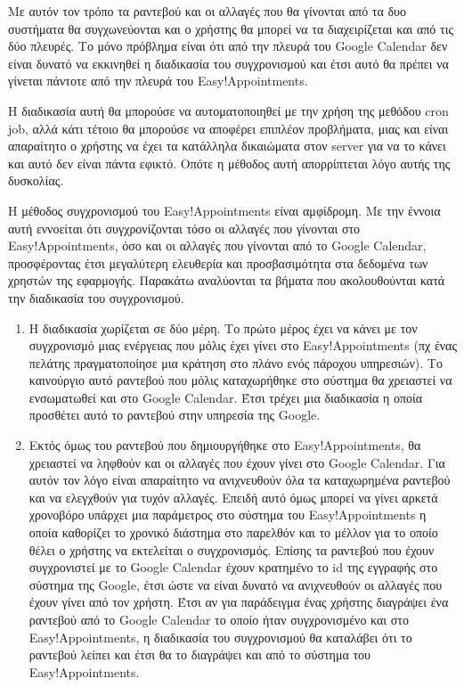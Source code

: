 Με αυτόν τον τρόπο τα ραντεβού και οι αλλαγές που θα γίνονται από τα δυο συστήματα θα συγχωνεύονται και ο χρήστης θα μπορεί να τα διαχειρίζεται και από τις δύο πλευρές. Το μόνο πρόβλημα είναι ότι από την πλευρά του Google Calendar δεν είναι δυνατό να εκκινηθεί η διαδικασία του συγχρονισμού και έτσι αυτό θα πρέπει να γίνεται πάντοτε από την πλευρά του Easy!Appointments. 

Η διαδικασία αυτή θα μπορούσε να αυτοματοποιηθεί με την χρήση της μεθόδου cron job, αλλά κάτι τέτοιο θα μπορούσε να αποφέρει επιπλέον προβλήματα, μιας και είναι απαραίτητο ο χρήστης να έχει τα κατάλληλα δικαιώματα στον server για να το κάνει και αυτό δεν είναι πάντα εφικτό. Οπότε η μέθοδος αυτή απορρίπτεται λόγο αυτής της δυσκολίας.

Η μέθοδος συγχρονισμού του Easy!Appointments είναι αμφίδρομη. Με την έννοια αυτή εννοείται ότι συγχρονίζονται τόσο οι αλλαγές που γίνονται στο Easy!Appointments, όσο και οι αλλαγές που γίνονται από το Google Calendar, προσφέροντας έτσι μεγαλύτερη ελευθερία και προσβασιμότητα στα δεδομένα των χρηστών της εφαρμογής. Παρακάτω αναλύονται τα βήματα που ακολουθούνται κατά την διαδικασία του συγχρονισμού.

\begin{enumerate}
\item Η διαδικασία χωρίζεται σε δύο μέρη. Το πρώτο μέρος έχει να κάνει με τον συγχρονισμό μιας ενέργειας που μόλις έχει γίνει στο Easy!Appointments (πχ ένας πελάτης πραγματοποίησε μια κράτηση στο πλάνο ενός πάροχου υπηρεσιών). Το καινούργιο αυτό ραντεβού που μόλις καταχωρήθηκε στο σύστημα θα χρειαστεί να ενσωματωθεί και στο Google Calendar. Έτσι τρέχει μια διαδικασία η οποία προσθέτει αυτό το ραντεβού στην υπηρεσία της Google. 
\item Εκτός όμως του ραντεβού που δημιουργήθηκε στο Easy!Appointments, θα χρειαστεί να ληφθούν και οι αλλαγές που έχουν γίνει στο Google Calendar. Για αυτόν τον λόγο είναι απαραίτητο να ανιχνευθούν όλα τα καταχωρημένα ραντεβού και να ελεγχθούν για τυχόν αλλαγές. Επειδή αυτό όμως μπορεί να γίνει αρκετά χρονοβόρο υπάρχει μια παράμετρος στο σύστημα του Easy!Appointments η οποία καθορίζει το χρονικό διάστημα στο παρελθόν και το μέλλον για το οποίο θέλει ο χρήστης να εκτελείται ο συγχρονισμός. Επίσης τα ραντεβού που έχουν συγχρονιστεί με το Google Calendar έχουν κρατημένο το id της εγγραφής στο σύστημα της Google, έτσι ώστε να είναι δυνατό να ανιχνευθούν οι αλλαγές που έχουν γίνει από τον χρήστη. Έτσι αν για παράδειγμα ένας χρήστης διαγράψει ένα ραντεβού από το Google Calendar το οποίο ήταν συγχρονισμένο και στο Easy!Appointments, η διαδικασία του συγχρονισμού θα καταλάβει ότι το ραντεβού λείπει και έτσι θα το διαγράψει και από το σύστημα του Easy!Appointments.
\end{enumerate}